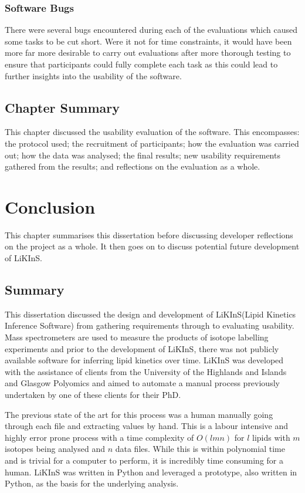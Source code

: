 \documentclass{l4proj}
\begin{document}
\subsection{Software Bugs}\label{bugs}
There were several bugs encountered during each of the evaluations which caused some tasks to be cut short. Were it not for time constraints, it would have been more far more desirable to carry out evaluations after more thorough testing to ensure that participants could fully complete each task as this could lead to further insights into the usability of the software.

\section{Chapter Summary}
This chapter discussed the usability evaluation of the software. This encompasses: the protocol used; the recruitment of participants; how the evaluation was carried out; how the data was analysed; the final results; new usability requirements gathered from the results; and reflections on the evaluation as a whole.


\chapter{Conclusion}
This chapter summarises this dissertation before discussing developer reflections on the project as a whole. It then goes on to discuss potential future development of LiKInS.
\section{Summary}
This dissertation discussed the design and development of LiKInS(Lipid Kinetics Inference Software) from gathering requirements through to evaluating usability. Mass spectrometers are used to measure the products of isotope labelling experiments and prior to the development of LiKInS, there was not publicly available software for inferring lipid kinetics over time. LiKInS was developed with the assistance of clients from the University of the Highlands and Islands and Glasgow Polyomics and aimed to automate a manual process previously undertaken by one of these clients for their PhD.

The previous state of the art for this process was a human manually going through each file and extracting values by hand. This is a labour intensive and highly error prone process with a time complexity of $O(lmn)$ for $l$ lipids with $m$ isotopes being analysed and $n$ data files. While this is within polynomial time and is trivial for a computer to perform, it is incredibly time consuming for a human. LiKInS was written in Python and leveraged a prototype, also written in Python, as the basis for the underlying analysis.
\end{document}
